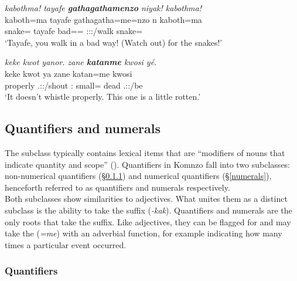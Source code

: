 \begin{exe}
	\ex \emph{kabothma! tayafe \textbf{gathagathamenzo} niyak! kabothma!}\\
	\gll kaboth=ma tayafe {gathagatha=me=nzo} n kaboth=ma\\
	snake=\Char{} tayafe bad=\Ins=\Only{} \Ssg:\Sbj:\Nonpast:\Ipfv/walk snake=\Char{}\\
	\trans `Tayafe, you walk in a bad way! (Watch out) for the snakes!'\\
	\label{ex050}
\end{exe}
\begin{exe}
	\ex \emph{keke kwot yanor. zane \textbf{katanme} kwosi yé.}\\
	\gll keke kwot ya zane katan=me kwosi \\
	\Neg{} properly \Tsg.\Masc:\Sbj:\Nonpast/shout \Dem:\Prox{} small=\Ins{} dead \Tsg.\Masc:\Nonpast:\Ipfv/be\\
	\trans `It doesn't whistle properly. This one is a little rotten.'\\
	\label{ex043}
\end{exe}

\subsection{Quantifiers and numerals} \label{numquant}

The  subclass typically contains lexical items that are ``modifiers of nouns that indicate quantity and scope'' (\citealt[37]{Schachter:2007vv}). Quantifiers in Komnzo fall into two subclasses: non-numerical quantifiers (\S{}\ref{quantifiers}) and numerical quantifiers (\S{}\ref{numerals}), henceforth referred to as quantifiers and numerals respectively.\\

Both subclasses show similarities to adjectives. What unites them as a distinct subclass is the ability to take the  suffix (\emph{-kak}). Quantifiers and numerals are the only roots that take the  suffix. Like adjectives, they can be flagged for  and may take the   (\emph{=me}) with an adverbial function, for example indicating how many times a particular event occurred.

\subsubsection{Quantifiers} \label{quantifiers}

